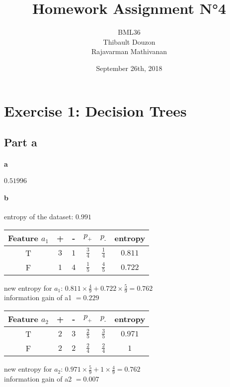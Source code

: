 \documentclass[a4paper, 10pt]{article}
\title{Homework Assignment N°4}
\author{BML36\\Thibault Douzon\\Rajavarman Mathivanan}
\date{September 26th, 2018}
\begin{document}
\maketitle

\pagebreak

\tableofcontents

\pagebreak
\section{Exercise 1: Decision Trees}
\subsection{Part a}
\paragraph{a}
$0.51996$
\paragraph{b}
entropy of the dataset: $0.991$
\begin{center}
    \begin{tabular}{ |c|c|c|c|c|c| }
        \hline
        Feature $a_1$ & +      & -     & $p_\text{+}$ & $p_\text{-}$ & entropy\\
        \hline
        T          & $3$    & $1$   & $\frac{3}{4}$ & $\frac{1}{4}$ & $0.811$\\
        \hline
        F          & $1$    & $4$   & $\frac{1}{5}$ & $\frac{4}{5}$ & $0.722$\\
        \hline
    \end{tabular}
\end{center}
new entropy for $a_1$: $0.811\times\frac{4}{9} + 0.722\times\frac{5}{9} = 0.762$
\\
information gain of a1 $= 0.229$

\begin{center}
    \begin{tabular}{ |c|c|c|c|c|c| }
        \hline
        Feature $a_2$ & +      & -     & $p_\text{+}$ & $p_\text{-}$ & entropy\\
        \hline
        T          & $2$    & $3$   & $\frac{2}{5}$ & $\frac{3}{5}$ & $0.971$\\
        \hline
        F          & $2$    & $2$   & $\frac{2}{4}$ & $\frac{2}{4}$ & $1$\\
        \hline
    \end{tabular}
\end{center}
new entropy for $a_2$: $0.971\times\frac{5}{9} + 1\times\frac{4}{9} = 0.762$
\\
information gain of a2 $= 0.007$
\end{document}
